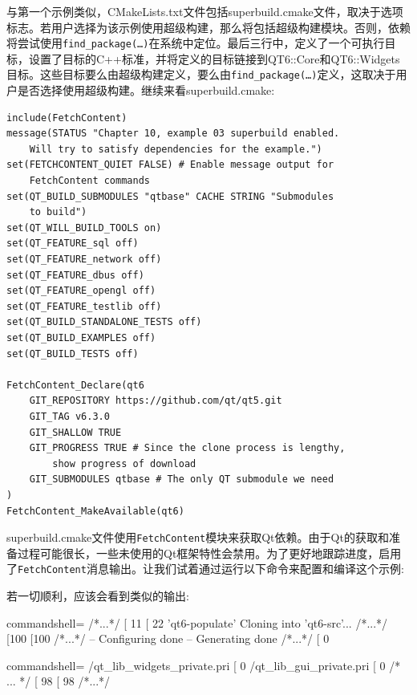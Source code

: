 与第一个示例类似，CMakeLists.txt文件包括superbuild.cmake文件，取决于选项标志。若用户选择为该示例使用超级构建，那么将包括超级构建模块。否则，依赖将尝试使用\texttt{find\_package(…)}在系统中定位。最后三行中，定义了一个可执行目标，设置了目标的C++标准，并将定义的目标链接到QT6::Core和QT6::Widgets目标。这些目标要么由超级构建定义，要么由\texttt{find\_package(…)}定义，这取决于用户是否选择使用超级构建。继续来看superbuild.cmake:

\begin{lstlisting}[style=styleCMake]
include(FetchContent)
message(STATUS "Chapter 10, example 03 superbuild enabled.
	Will try to satisfy dependencies for the example.")
set(FETCHCONTENT_QUIET FALSE) # Enable message output for
	FetchContent commands
set(QT_BUILD_SUBMODULES "qtbase" CACHE STRING "Submodules
	to build")
set(QT_WILL_BUILD_TOOLS on)
set(QT_FEATURE_sql off)
set(QT_FEATURE_network off)
set(QT_FEATURE_dbus off)
set(QT_FEATURE_opengl off)
set(QT_FEATURE_testlib off)
set(QT_BUILD_STANDALONE_TESTS off)
set(QT_BUILD_EXAMPLES off)
set(QT_BUILD_TESTS off)

FetchContent_Declare(qt6
	GIT_REPOSITORY https://github.com/qt/qt5.git
	GIT_TAG v6.3.0
	GIT_SHALLOW TRUE
	GIT_PROGRESS TRUE # Since the clone process is lengthy,
		show progress of download
	GIT_SUBMODULES qtbase # The only QT submodule we need
)
FetchContent_MakeAvailable(qt6)
\end{lstlisting}

superbuild.cmake文件使用\texttt{FetchContent}模块来获取Qt依赖。由于Qt的获取和准备过程可能很长，一些未使用的Qt框架特性会禁用。为了更好地跟踪进度，启用了\texttt{FetchContent}消息输出。让我们试着通过运行以下命令来配置和编译这个示例:


若一切顺利，应该会看到类似的输出:

\begin{tcblisting}{commandshell={}}
/*...*/
[ 11%
[ 22%
  'qt6-populate'
Cloning into 'qt6-src'...
/*...*/
[100%
[100%
/*...*/
-- Configuring done
-- Generating done
/*...*/
[ 0%
\end{tcblisting}
\begin{tcblisting}{commandshell={}}
  /qt_lib_widgets_private.pri
[ 0%
/qt_lib_gui_private.pri
[ 0%
/* ... */
[ 98%
[ 98%
/*...*/
\end{tcblisting}

